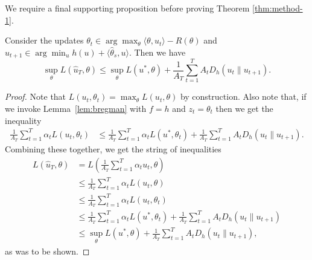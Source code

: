 \documentclass{article} %
\begin{document}
We require a final supporting proposition before proving Theorem \ref{thm:method-1}. 

\begin{proposition}
\label{prop:method-1}
Consider the updates $\theta_t \in \arg\max_{\theta} \langle \theta, u_t \rangle - R(\theta)$ 
and $u_{t+1} \in \arg\min_u h(u) + \langle \hat{\theta}_s, u \rangle$. 
Then we have
\begin{equation}
\sup_{\theta} L(\hat{u}_T, \theta) \leq \sup_{\theta} L(u^*, \theta) + \frac{1}{A_T} \sum_{t=1}^T A_tD_h(u_t \| u_{t+1}).
\end{equation}
\end{proposition}
\begin{proof}
Note that $L(u_t, \theta_t) = \max_{\theta} L(u_t, \theta)$ by construction. 
Also note that, if we invoke Lemma~\ref{lem:bregman} with $f = h$ and 
$z_t = \theta_t$ then we get the inequality
\begin{align}
\frac{1}{A_T} \sum_{t=1}^T \alpha_t L(u_t, \theta_t) 
&\leq \frac{1}{A_T} \sum_{t=1}^T \alpha_t L(u^*, \theta_t) + \frac{1}{A_T} \sum_{t=1}^T A_tD_h(u_t \| u_{t+1}).
\end{align}
Combining these together, we get the string of inequalities
\begin{align*} 
L(\hat{u}_T, \theta) &= L\left(\frac{1}{A_T} \sum_{t=1}^T \alpha_tu_t, \theta\right) \\
 &\leq \frac{1}{A_T} \sum_{t=1}^T \alpha_t L(u_t, \theta) \\
 &\leq \frac{1}{A_T} \sum_{t=1}^T \alpha_t L(u_t, \theta_t) \\
 &\leq \frac{1}{A_T} \sum_{t=1}^T \alpha_t L(u^*, \theta_t) + \frac{1}{A_T} \sum_{t=1}^T A_t D_h(u_t \| u_{t+1}) \\
 &\leq \sup_{\theta} L(u^*, \theta) + \frac{1}{A_T} \sum_{t=1}^T A_tD_h(u_t \| u_{t+1}),
\end{align*}
as was to be shown.
\end{proof}
\end{document}
